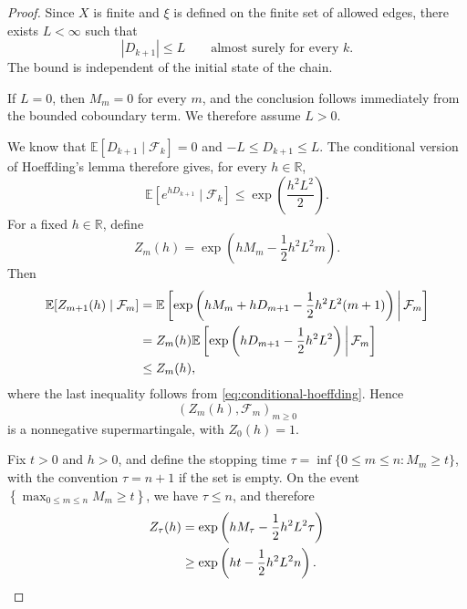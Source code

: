 \documentclass[11pt,a4paper]{amsart}
\theoremstyle{definition}
\theoremstyle{remark}
\numberwithin{equation}{section}
\newcommand{\RR}{\mathbb R}
\newcommand{\EE}{\mathbb E}
\newcommand{\1}{\boldsymbol 1}
\begin{document}
\begin{proof}
Since $X$ is finite and $\xi$ is defined on the finite set
of allowed edges, there exists $L<\infty$ such that
\begin{equation}\label{eq:bounded-martingale-increments}
 |D_{k+1}|\le L
 \qquad\text{almost surely for every }k.
\end{equation}
The bound is independent of the initial state of the chain.

If $L=0$, then $M_m=0$ for every $m$, and the conclusion follows
immediately from the bounded coboundary term.  We therefore assume
$L>0$.

We know that $\EE[D_{k+1}\mid\mathcal F_k]=0$
and $-L\le D_{k+1}\le L$.
The conditional version of Hoeffding's lemma therefore gives, for every $h\in\RR$,
\begin{equation}\label{eq:conditional-hoeffding}
 \EE\left[
   e^{hD_{k+1}}
   \mid\mathcal F_k
 \right]
 \le
 \exp\left(\frac{h^2L^2}{2}\right).
\end{equation}
For a fixed $h\in\RR$, define
\begin{equation}\label{eq:exponential-supermartingale}
 Z_m(h)
 =
 \exp\left(
   hM_m-\frac12h^2L^2m
 \right).
\end{equation}
Then
\begin{align}
 \EE[Z_{m+1}(h)\mid\mathcal F_m]
 &=
 \EE\left[
   \exp\left(
     hM_m+hD_{m+1}
     -\frac12h^2L^2(m+1)
   \right)
   \,\middle|\,\mathcal F_m
 \right]
 \notag\\
 &=
 Z_m(h)
 \EE\left[
   \exp\left(
     hD_{m+1}-\frac12h^2L^2
   \right)
   \,\middle|\,\mathcal F_m
 \right]
 \notag\\
 &\le Z_m(h),
\end{align}
where the last inequality follows from
\eqref{eq:conditional-hoeffding}.  Hence
$$
 (Z_m(h),\mathcal F_m)_{m\ge0}
$$
is a nonnegative supermartingale, with $Z_0(h)=1$.

Fix $t>0$ and $h>0$, and define the stopping time $\tau = \inf\{0\le m\le n:M_m\ge t\}$,
with the convention $\tau=n+1$ if the set is empty.  On the event
 $\left\{\max_{0\le m\le n}M_m\ge t\right\}$, we have $\tau\le n$, and therefore
\begin{align}
 Z_\tau(h)
 &=
 \exp\left(
   hM_\tau-\frac12h^2L^2\tau
 \right)
 \notag\\
 &\ge
 \exp\left(
   ht-\frac12h^2L^2n
 \right).
 \label{eq:stopped-exponential-lower-bound}
\end{align}


\end{proof}
\end{document}
